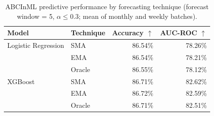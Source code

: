 \begin{table}
  \small
  \caption{ABCInML predictive performance by forecasting technique (forecast window = 5, $\alpha \leq 0.3$; mean of monthly and weekly batches).}
  \label{tab:forecasting-acc-auc}
  \begin{tabular}{llrr}
    \toprule
    Model & Technique & Accuracy $\uparrow$ & AUC-ROC $\uparrow$ \\
    \midrule
    Logistic Regression & SMA & 86.54\% & 78.26\% \\
     & EMA & 86.54\% & 78.21\% \\
     & Oracle & 86.55\% & 78.12\% \\
    \midrule
    XGBoost & SMA & 86.71\% & 82.62\% \\
     & EMA & 86.72\% & 82.59\% \\
     & Oracle & 86.71\% & 82.51\% \\
    \bottomrule
  \end{tabular}
\end{table}

